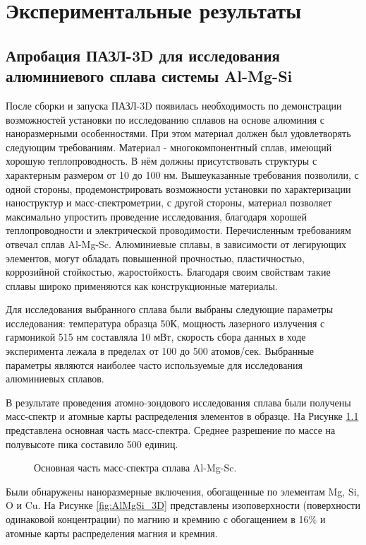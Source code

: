 \chapter{Экспериментальные результаты}\label{ch:ch4}

\section{Апробация ПАЗЛ-3D для исследования алюминиевого сплава системы Al-Mg-Si}\label{sec:ch4/sect1}

После сборки и запуска ПАЗЛ-3D появилась необходимость по демонстрации возможностей установки по исследованию сплавов на основе алюминия  с наноразмерными особенностями. При этом материал должен был удовлетворять следующим требованиям. Материал - многокомпонентный сплав, имеющий хорошую теплопроводность. В нём должны присутствовать структуры с характерным размером от 10 до 100 нм. Вышеуказанные требования позволили, с одной стороны, продемонстрировать возможности установки по характеризации наноструктур и масс-спектрометрии, с другой стороны, материал позволяет максимально упростить проведение исследования, благодаря хорошей теплопроводности и электрической проводимости. Перечисленным требованиям отвечал сплав Al-Mg-Sc. Алюминиевые сплавы, в зависимости от легирующих элементов, могут обладать повышенной прочностью, пластичностью, коррозийной стойкостью, жаростойкость. Благодаря своим свойствам такие сплавы широко применяются как конструкционные материалы.

Для исследования выбранного сплава были выбраны следующие параметры исследования: температура образца 50К, мощность лазерного излучения с гармоникой 515 нм составляла 10 мВт, скорость сбора данных в ходе эксперимента лежала в пределах от 100 до 500 атомов/сек. Выбранные параметры являются наиболее часто используемые для исследования алюминиевых сплавов.

В результате проведения атомно-зондового исследования сплава были получены масс-спектр и атомные карты распределения элементов в образце. На Рисунке \cref{fig:AlMgSi_mass} представлена основная часть масс-спектра. Среднее разрешение по массе на полувысоте пика составило 500 единиц.

\begin{figure}[htb]
	\caption{Основная часть масс-спектра сплава Al-Mg-Sc.}
	\label{fig:AlMgSi_mass}
\end{figure} 
\FloatBarrier
Были обнаружены наноразмерные включения, обогащенные по элементам Mg, Si, O и Cu. На Рисунке \cref{fig:AlMgSi_3D} представлены изоповерхности (поверхности одинаковой концентрации) по магнию и кремнию с обогащением в 16$\%$ и атомные карты распределения магния и кремния.

